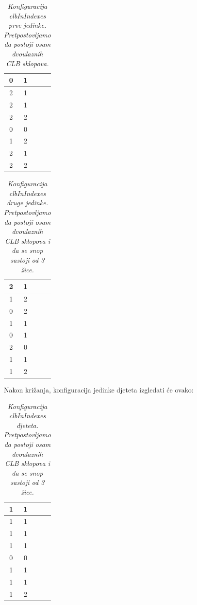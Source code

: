 \documentclass[times, utf8, zavrsni]{fer}
\begin{document}
	\begin{table}[H]
		\caption{\emph{Konfiguracija \emph{clbInIndexes} prve jedinke. Pretpostovljamo da postoji osam dvoulaznih CLB sklopova.}}
		\label{chromoClbIndex1}
		\centering
		\begin{tabular}{|c|c|c|c|} \hline
			0 & 1 \\ \hline
			2 & 1 \\ \hline
			2 & 1 \\ \hline
			2 & 2 \\ \hline
			0 & 0 \\ \hline
			1 & 2 \\ \hline
			2 & 1 \\ \hline
			2 & 2 \\ \hline
		\end{tabular}
	\end{table}
	
	\begin{table}[H]
		\caption{\emph{Konfiguracija \emph{clbInIndexes} druge jedinke. Pretpostovljamo da postoji osam dvoulaznih CLB sklopova i da se snop sastoji od 3 žice. }}
		\label{chromoClbIndex2}
		\centering
		\begin{tabular}{|c|c|c|c|} \hline
			2 & 1 \\ \hline
			1 & 2 \\ \hline
			0 & 2 \\ \hline
			1 & 1 \\ \hline
			0 & 1 \\ \hline
			2 & 0 \\ \hline
			1 & 1 \\ \hline
			1 & 2 \\ \hline
		\end{tabular}
	\end{table} 
	
	Nakon križanja, konfiguracija jedinke djeteta izgledati će ovako:
	
	\begin{table}[H]
		\caption{\emph{Konfiguracija \emph{clbInIndexes} djeteta. Pretpostovljamo da postoji osam dvoulaznih CLB sklopova i da se snop sastoji od 3 žice. }}
		\label{chromoClbIndexChild}
		\centering
		\begin{tabular}{|c|c|c|c|} \hline
			1 & 1 \\ \hline
			1 & 1 \\ \hline
			1 & 1 \\ \hline
			1 & 1 \\ \hline
			0 & 0 \\ \hline
			1 & 1 \\ \hline
			1 & 1 \\ \hline
			1 & 2 \\ \hline
		\end{tabular}
	\end{table}
	
\end{document}
